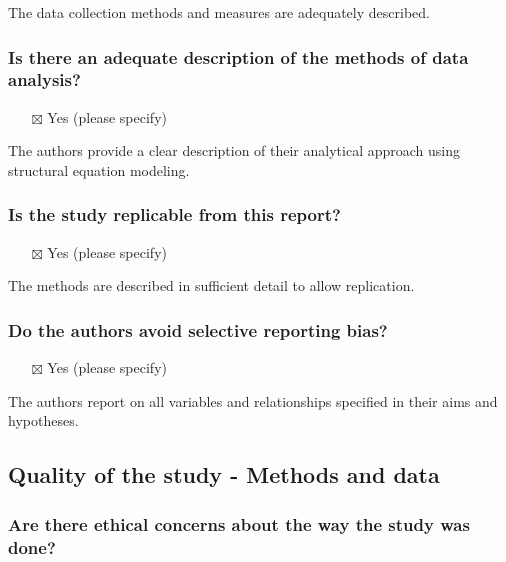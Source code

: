 \documentclass[
  doc, a4paper]{apa7}
\providecommand{\tightlist}{%
  \setlength{\itemsep}{0pt}\setlength{\parskip}{0pt}}
\begin{document}
The data collection methods and measures are adequately described.

\subsubsection{Is there an adequate description of the methods of data analysis?}\label{is-there-an-adequate-description-of-the-methods-of-data-analysis}

\begin{itemize}
\tightlist
\item[$\boxtimes$]
  Yes (please specify)
\end{itemize}

The authors provide a clear description of their analytical approach using structural equation modeling.

\subsubsection{Is the study replicable from this report?}\label{is-the-study-replicable-from-this-report}

\begin{itemize}
\tightlist
\item[$\boxtimes$]
  Yes (please specify)
\end{itemize}

The methods are described in sufficient detail to allow replication.

\subsubsection{Do the authors avoid selective reporting bias?}\label{do-the-authors-avoid-selective-reporting-bias}

\begin{itemize}
\tightlist
\item[$\boxtimes$]
  Yes (please specify)
\end{itemize}

The authors report on all variables and relationships specified in their aims and hypotheses.

\subsection{Quality of the study - Methods and data}\label{quality-of-the-study---methods-and-data}

\subsubsection{Are there ethical concerns about the way the study was done?}\label{are-there-ethical-concerns-about-the-way-the-study-was-done}
\end{document}
